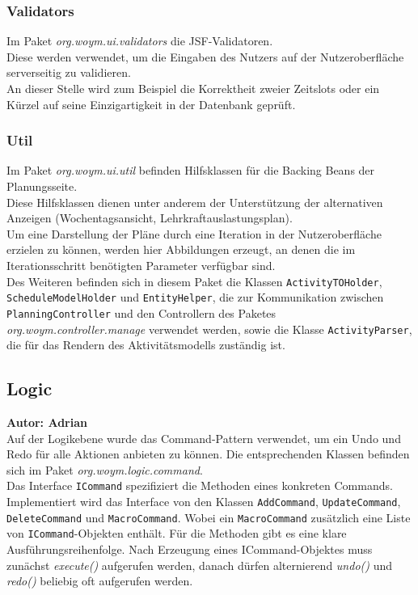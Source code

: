 \documentclass[fontsize=12pt,paper=a4,twoside]{scrartcl}
\begin{document}
\subsubsection{Validators}

Im Paket \textit{org.woym.ui.validators} die JSF-Validatoren.\\
Diese werden verwendet, um die Eingaben des Nutzers auf der Nutzeroberfläche serverseitig zu validieren.\\
An dieser Stelle wird zum Beispiel die Korrektheit zweier Zeitslots oder ein Kürzel auf seine Einzigartigkeit in der Datenbank geprüft.\\

\subsubsection{Util}

Im Paket \textit{org.woym.ui.util} befinden Hilfsklassen für die Backing Beans der Planungsseite.\\ Diese Hilfsklassen dienen unter anderem der Unterstützung der alternativen Anzeigen (Wochentagsansicht, Lehrkraftauslastungsplan).\\
Um eine Darstellung der Pläne durch eine Iteration in der Nutzeroberfläche erzielen zu können, werden hier Abbildungen erzeugt, an denen die im Iterationsschritt benötigten Parameter verfügbar sind.\\
Des Weiteren befinden sich in diesem Paket die Klassen \texttt{ActivityTOHolder}, \texttt{ScheduleModelHolder} und \texttt{EntityHelper}, die zur Kommunikation zwischen \texttt{PlanningController} und den Controllern des Paketes \textit{org.woym.controller.manage} verwendet werden, sowie die Klasse \texttt{ActivityParser}, die für das Rendern des Aktivitätsmodells zuständig ist.  \clearpage




\subsection{Logic}
\label{subsec:logic}
\textbf{Autor: Adrian}\\

Auf der Logikebene wurde das Command-Pattern verwendet, um ein Undo und Redo für alle Aktionen anbieten zu können. Die entsprechenden Klassen befinden sich im Paket \textit{org.woym.logic.command}. \\
Das Interface \texttt{ICommand} spezifiziert die Methoden eines konkreten Commands. Implementiert wird das Interface von den Klassen \texttt{AddCommand}, \texttt{UpdateCommand}, \texttt{DeleteCommand} und \texttt{MacroCommand}. Wobei ein \texttt{MacroCommand} zusätzlich eine Liste von \texttt{ICommand}-Objekten enthält. Für die Methoden gibt es eine klare Ausführungsreihenfolge. Nach Erzeugung eines ICommand-Objektes muss zunächst \textit{execute()} aufgerufen werden, danach dürfen alternierend \textit{undo()} und \textit{redo()} beliebig oft aufgerufen werden. \\
\end{document}
